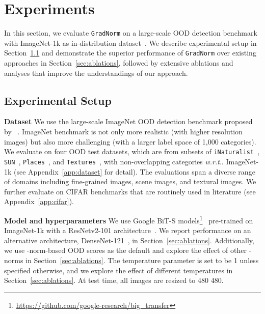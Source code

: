 \documentclass{article}
\makeatletter
\DeclareRobustCommand\onedot{\futurelet\@let@token\@onedot}
\def\@onedot{\ifx\@let@token.\else.\null\fi\xspace}
\def\wrt{\emph{w.r.t}\onedot} \def\dof{d.o.f\onedot}
\makeatother
\begin{document}
\vspace{-0.3cm}

\section{Experiments}
\label{sec:experiments}
\vspace{-0.3cm}
In this section, we evaluate \texttt{GradNorm} on a large-scale OOD detection benchmark with ImageNet-1k as in-distribution dataset~\cite{huang2021mos}. We describe experimental setup in Section~\ref{sec:exp_setup} and demonstrate the superior performance of \texttt{GradNorm} over existing approaches in Section~\ref{sec:ablations}, followed by extensive ablations and analyses that improve the understandings of our approach. 

\vspace{-0.2cm}
\subsection{Experimental Setup}
\label{sec:exp_setup}
\vspace{-0.2cm}
\textbf{Dataset} 
We use the large-scale ImageNet OOD detection benchmark proposed by \citeauthor{huang2021mos}~\cite{huang2021mos}.
ImageNet benchmark is not only more realistic (with higher resolution images) but also more challenging (with a larger label space of 1,000 categories). 
We evaluate on four OOD test datasets, which are from subsets of \texttt{iNaturalist}~\cite{van2018inaturalist}, \texttt{SUN}~\cite{xiao2010sun}, \texttt{Places}~\cite{zhou2017places}, and \texttt{Textures}~\cite{cimpoi2014describing}, with non-overlapping categories \wrt ImageNet-1k (see Appendix~\ref{app:dataset} for detail). The evaluations span a diverse range of domains including fine-grained images, scene images, and textural images. We further evaluate on CIFAR benchmarks that are routinely used in literature (see Appendix~\ref{app:cifar}).






\textbf{Model and hyperparameters} 
We use Google BiT-S models\footnote{\url{https://github.com/google-research/big_transfer}}~\cite{kolesnikov2020big} pre-trained on ImageNet-1k with a ResNetv2-101 architecture~\cite{he2016identity}. We report performance on an alternative architecture, DenseNet-121~\cite{huang2017densely}, in Section~\ref{sec:ablations}. Additionally, we use -norm-based OOD scores as the default and explore the effect of other -norms in Section~\ref{sec:ablations}. The temperature parameter  is set to be 1 unless specified otherwise, and we explore the effect of different temperatures in Section~\ref{sec:ablations}. At test time, all images are resized to 480  480.
\end{document}
